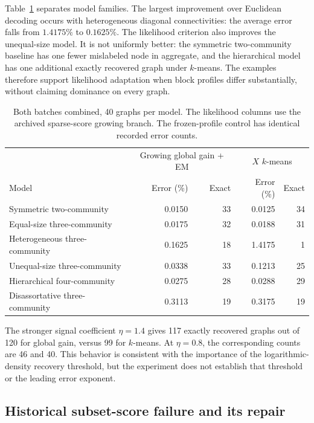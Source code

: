 Table~\ref{tab:experiment_models} separates model families. The largest
improvement over Euclidean decoding occurs with heterogeneous diagonal
connectivities: the average error falls from $1.4175\%$ to $0.1625\%$.
The likelihood criterion also improves the unequal-size model. It is not
uniformly better: the symmetric two-community baseline has one fewer
mislabeled node in aggregate, and the hierarchical model has one additional
exactly recovered graph under $k$-means. The examples therefore support
likelihood adaptation when block profiles differ substantially, without
claiming dominance on every graph.

\begin{table}[tb]
\centering
\small
\caption{Both batches combined, 40 graphs per model. The likelihood columns use the archived sparse-score growing branch. The frozen-profile control has identical recorded error counts.}
\label{tab:experiment_models}
\begin{tabular}{lrrrr}
\toprule
&\multicolumn{2}{c}{Growing global gain + EM}&\multicolumn{2}{c}{$X$ $k$-means}\\
Model&Error (\%)&Exact&Error (\%)&Exact\\
\midrule
Symmetric two-community&0.0150&33&0.0125&34\\
Equal-size three-community&0.0175&32&0.0188&31\\
Heterogeneous three-community&0.1625&18&1.4175&1\\
Unequal-size three-community&0.0338&33&0.1213&25\\
Hierarchical four-community&0.0275&28&0.0288&29\\
Disassortative three-community&0.3113&19&0.3175&19\\
\bottomrule
\end{tabular}
\end{table}

The stronger signal coefficient $\eta=1.4$ gives 117 exactly recovered graphs
out of 120 for global gain, versus 99 for $k$-means. At $\eta=0.8$, the
corresponding counts are 46 and 40. This behavior is consistent with the
importance of the logarithmic-density recovery threshold, but the experiment
does not establish that threshold or the leading error exponent.

\subsection{Historical subset-score failure and its repair}

